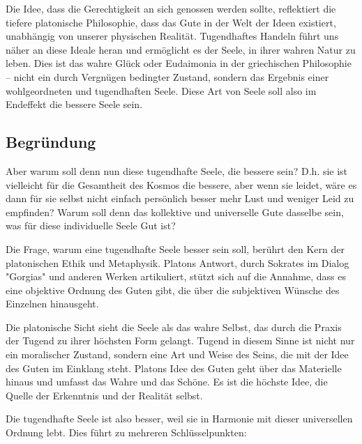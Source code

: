 \documentclass[12pt,a4paper]{article}
\begin{document}
Die Idee, dass die Gerechtigkeit an sich genossen werden sollte, reflektiert die tiefere platonische Philosophie, dass das Gute in der Welt der Ideen existiert, unabhängig von unserer physischen Realität. Tugendhaftes Handeln führt uns näher an diese Ideale heran und ermöglicht es der Seele, in ihrer wahren Natur zu leben. Dies ist das wahre Glück oder Eudaimonia in der griechischen Philosophie – nicht ein durch Vergnügen bedingter Zustand, sondern das Ergebnis einer wohlgeordneten und tugendhaften Seele. Diese Art von Seele soll also im Endeffekt die bessere Seele sein.

\subsection[short]{Begründung}
Aber warum soll denn nun diese tugendhafte Seele, die bessere sein? D.h. sie ist vielleicht für die Gesamtheit des Kosmos die bessere, aber wenn sie leidet, wäre es dann für sie selbst nicht einfach persönlich besser mehr Lust und weniger Leid zu empfinden? Warum soll denn das kollektive und universelle Gute dasselbe sein, was für diese individuelle Seele Gut ist?

Die Frage, warum eine tugendhafte Seele besser sein soll, berührt den Kern der platonischen Ethik und Metaphysik. Platons Antwort, durch Sokrates im Dialog "Gorgias" und anderen Werken artikuliert, stützt sich auf die Annahme, dass es eine objektive Ordnung des Guten gibt, die über die subjektiven Wünsche des Einzelnen hinausgeht.

Die platonische Sicht sieht die Seele als das wahre Selbst, das durch die Praxis der Tugend zu ihrer höchsten Form gelangt. Tugend in diesem Sinne ist nicht nur ein moralischer Zustand, sondern eine Art und Weise des Seins, die mit der Idee des Guten im Einklang steht. Platons Idee des Guten geht über das Materielle hinaus und umfasst das Wahre und das Schöne. Es ist die höchste Idee, die Quelle der Erkenntnis und der Realität selbst.

Die tugendhafte Seele ist also besser, weil sie in Harmonie mit dieser universellen Ordnung lebt. Dies führt zu mehreren Schlüsselpunkten:
\end{document}
